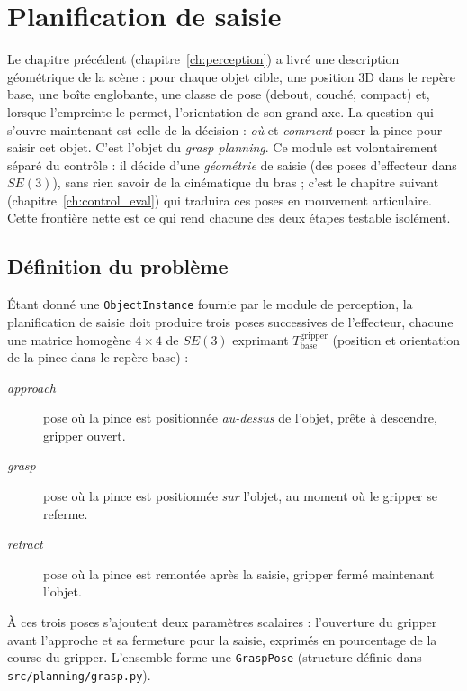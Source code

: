 \chapter{Planification de saisie}
\label{ch:planning}

Le chapitre précédent (chapitre~\ref{ch:perception}) a livré une description
géométrique de la scène : pour chaque objet cible, une position 3D dans le
repère base, une boîte englobante, une classe de pose (debout, couché, compact)
et, lorsque l'empreinte le permet, l'orientation de son grand axe. La question
qui s'ouvre maintenant est celle de la décision : \emph{où} et \emph{comment}
poser la pince pour saisir cet objet. C'est l'objet du \textit{grasp planning}.
Ce module est volontairement séparé du contrôle : il décide d'une
\emph{géométrie} de saisie (des poses d'effecteur dans \(SE(3)\)), sans rien
savoir de la cinématique du bras ; c'est le chapitre suivant
(chapitre~\ref{ch:control_eval}) qui traduira ces poses en mouvement
articulaire. Cette frontière nette est ce qui rend chacune des deux étapes
testable isolément.

\section{Définition du problème}
\label{sec:plan_pb}

Étant donné une \texttt{ObjectInstance} fournie par le module de perception, la
planification de saisie doit produire trois poses successives de l'effecteur,
chacune une matrice homogène \(4\times4\) de \(SE(3)\) exprimant
\(T_{\text{base}}^{\text{gripper}}\) (position et orientation de la pince dans le
repère base) :

\begin{description}
  \item[\textit{approach}] pose où la pince est positionnée \emph{au-dessus} de
        l'objet, prête à descendre, gripper ouvert.
  \item[\textit{grasp}] pose où la pince est positionnée \emph{sur} l'objet, au
        moment où le gripper se referme.
  \item[\textit{retract}] pose où la pince est remontée après la saisie, gripper
        fermé maintenant l'objet.
\end{description}

À ces trois poses s'ajoutent deux paramètres scalaires : l'ouverture du gripper
avant l'approche et sa fermeture pour la saisie, exprimés en pourcentage de la
course du gripper. L'ensemble forme une \texttt{GraspPose}
(structure définie dans \texttt{src/planning/grasp.py}).

